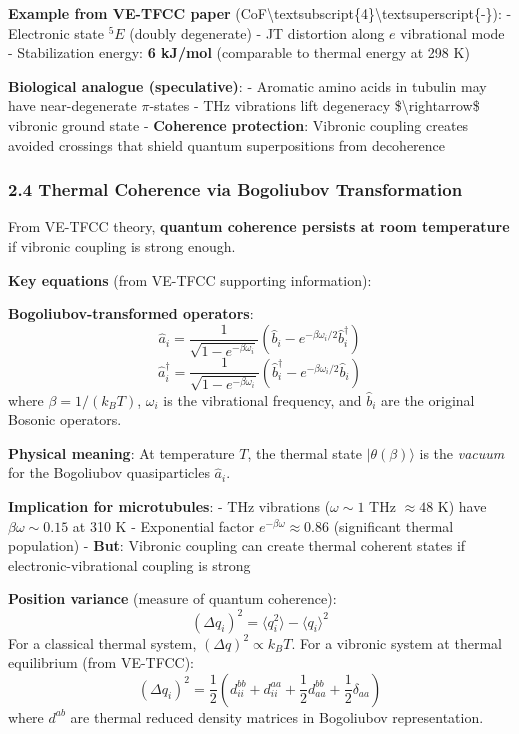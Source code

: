 \textbf{Example from VE-TFCC paper}
(CoF\textbackslash textsubscript\{4\}\textbackslash textsuperscript\{-\}):
- Electronic state \(^5E\) (doubly degenerate) - JT distortion along
\(e\) vibrational mode - Stabilization energy: \textbf{6 kJ/mol}
(comparable to thermal energy at 298 K)

\textbf{Biological analogue (speculative)}: - Aromatic amino acids in
tubulin may have near-degenerate \(\pi\)-states - THz vibrations lift
degeneracy \$\textbackslash rightarrow\$ vibronic ground state -
\textbf{Coherence protection}: Vibronic coupling creates avoided
crossings that shield quantum superpositions from decoherence

\subsubsection{2.4 Thermal Coherence via Bogoliubov
Transformation}\label{thermal-coherence-via-bogoliubov-transformation}

From VE-TFCC theory, \textbf{quantum coherence persists at room
temperature} if vibronic coupling is strong enough.

\textbf{Key equations} (from VE-TFCC supporting information):

\textbf{Bogoliubov-transformed operators}:
\[\hat{a}_i = \frac{1}{\sqrt{1 - e^{-\beta \omega_i}}} \left( \hat{b}_i - e^{-\beta \omega_i/2} \hat{b}_i^\dagger \right)\]
\[\hat{a}_i^\dagger = \frac{1}{\sqrt{1 - e^{-\beta \omega_i}}} \left( \hat{b}_i^\dagger - e^{-\beta \omega_i/2} \hat{b}_i \right)\]
where \(\beta = 1/(k_B T)\), \(\omega_i\) is the vibrational frequency,
and \(\hat{b}_i\) are the original Bosonic operators.

\textbf{Physical meaning}: At temperature \(T\), the thermal state
\(|\theta(\beta)\rangle\) is the \emph{vacuum} for the Bogoliubov
quasiparticles \(\hat{a}_i\).

\textbf{Implication for microtubules}: - THz vibrations
(\(\omega \sim 1\) THz \(\approx 48\) K) have \(\beta \omega \sim 0.15\)
at 310 K - Exponential factor \(e^{-\beta \omega} \approx 0.86\)
(significant thermal population) - \textbf{But}: Vibronic coupling can
create thermal coherent states if electronic-vibrational coupling is
strong

\textbf{Position variance} (measure of quantum coherence):
\[(\Delta q_i)^2 = \langle q_i^2 \rangle - \langle q_i \rangle^2\] For a
classical thermal system, \((\Delta q)^2 \propto k_B T\). For a vibronic
system at thermal equilibrium (from VE-TFCC):
\[(\Delta q_i)^2 = \frac{1}{2} \left( d_{ii}^{bb} + d_{ii}^{aa} + \frac{1}{2} d_{aa}^{bb} + \frac{1}{2} \delta_{aa} \right)\]
where \(d^{ab}\) are thermal reduced density matrices in Bogoliubov
representation.

